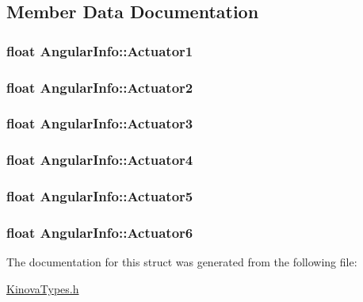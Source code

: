 \subsection{Member Data Documentation}
\hypertarget{struct_angular_info_a5fc555c085bddc82c33a3039fbc40932}{
\subsubsection[{Actuator1}]{\setlength{\rightskip}{0pt plus 5cm}float Angular\-Info\-::\-Actuator1}}\label{struct_angular_info_a5fc555c085bddc82c33a3039fbc40932}
\hypertarget{struct_angular_info_ab7b9349eef239f9741d9c28a795e4c35}{
\subsubsection[{Actuator2}]{\setlength{\rightskip}{0pt plus 5cm}float Angular\-Info\-::\-Actuator2}}\label{struct_angular_info_ab7b9349eef239f9741d9c28a795e4c35}
\hypertarget{struct_angular_info_a30426eab94c82cfd3d697bbc8c506c2a}{
\subsubsection[{Actuator3}]{\setlength{\rightskip}{0pt plus 5cm}float Angular\-Info\-::\-Actuator3}}\label{struct_angular_info_a30426eab94c82cfd3d697bbc8c506c2a}
\hypertarget{struct_angular_info_a46a1314c4846de6a495310b44fe5e0c3}{
\subsubsection[{Actuator4}]{\setlength{\rightskip}{0pt plus 5cm}float Angular\-Info\-::\-Actuator4}}\label{struct_angular_info_a46a1314c4846de6a495310b44fe5e0c3}
\hypertarget{struct_angular_info_a953c29d2481eb1c42c84e9c992d34dde}{
\subsubsection[{Actuator5}]{\setlength{\rightskip}{0pt plus 5cm}float Angular\-Info\-::\-Actuator5}}\label{struct_angular_info_a953c29d2481eb1c42c84e9c992d34dde}
\hypertarget{struct_angular_info_ab54771129d8a9e451c27942dd349340d}{
\subsubsection[{Actuator6}]{\setlength{\rightskip}{0pt plus 5cm}float Angular\-Info\-::\-Actuator6}}\label{struct_angular_info_ab54771129d8a9e451c27942dd349340d}


The documentation for this struct was generated from the following file\-:\begin{DoxyCompactItemize}
\item 
\hyperlink{_kinova_types_8h}{Kinova\-Types.\-h}\end{DoxyCompactItemize}
